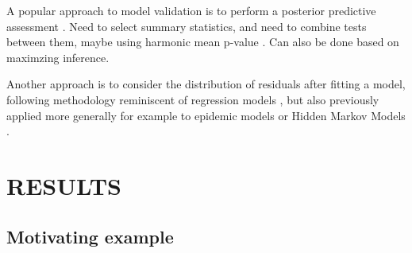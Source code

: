 \documentclass{article}
\begin{document}
A popular approach to model validation is to perform a posterior predictive assessment
\citep{Meng1994,Gelman1996}.
Need to select summary statistics, and need to combine
tests between them, maybe using harmonic mean
p-value \citep{wilsonHarmonicMeanPvalue2019}.
Can also be done based on maximzing inference.

Another approach is to consider the distribution of residuals after fitting a model, following methodology
reminiscent of regression models
\citep{coxGeneralDefinitionResiduals1968,dunnRandomizedQuantileResiduals1996},
but also previously applied more generally for example to
epidemic models \citep{lauNewModelDiagnostics2014} or 
Hidden Markov Models \citep{zucchini2009hidden,buckbyModelCheckingHidden2020}.

\section*{RESULTS}

\subsection*{Motivating example}
\end{document}
